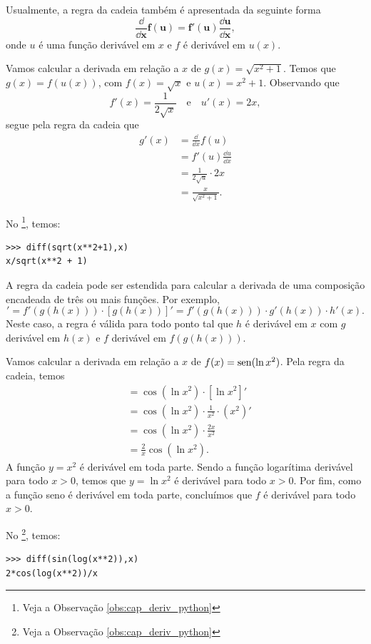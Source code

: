 Usualmente, a regra da cadeia também é apresentada da seguinte forma
\begin{equation}\label{eq:deriv_regra_da_cadeia}
  \pmb{\frac{\dd}{\dd x}f(u) = f'(u)\frac{\dd u}{\dd x}},
\end{equation}
onde $u$ é uma função derivável em $x$ e $f$ é derivável em $u(x)$.

\begin{ex}
  Vamos calcular a derivada em relação a $x$ de $g(x) = \sqrt{x^2+1}$. Temos que $g(x) = f(u(x))$, com $f(x) = \sqrt{x}$ e $u(x) = x^2+1$. Observando que
  \begin{equation}
    f'(x) = \frac{1}{2\sqrt{x}}\quad\text{e}\quad u'(x)=2x,
  \end{equation}
  segue pela regra da cadeia que
  \begin{align}
    g'(x) &= \frac{\dd}{\dd x}f(u) \\
          &= f'(u)\frac{\dd u}{\dd x} \\
          &= \frac{1}{2\sqrt{u}}\cdot 2x \\
          &= \frac{x}{\sqrt{x^2+1}}.
  \end{align}

  \ifispython
  No \sympy\footnote{Veja a Observação \ref{obs:cap_deriv_python}}, temos:
\begin{verbatim}
>>> diff(sqrt(x**2+1),x)
x/sqrt(x**2 + 1)
\end{verbatim}
  \fi  
\end{ex}

A regra da cadeia pode ser estendida para calcular a derivada de uma composição encadeada de três ou mais funções. Por exemplo,
\begin{equation}
  [f(g(h(x)))]' = f'(g(h(x)))\cdot[g(h(x))]' = f'(g(h(x)))\cdot g'(h(x))\cdot h'(x).
\end{equation}
Neste caso, a regra é válida para todo ponto tal que $h$ é derivável em $x$ com $g$ derivável em $h(x)$ e $f$ derivável em $f(g(h(x)))$.

\begin{ex}
  Vamos calcular a derivada em relação a $x$ de $f(x) = \operatorname{sen}(\ln x^2)$. Pela regra da cadeia, temos
  \begin{align}
    [\sen(\ln x^2)] &= \cos(\ln x^2)\cdot[\ln x^2]' \\
                    &= \cos(\ln x^2)\cdot \frac{1}{x^2}\cdot (x^2)' \\
                    &= \cos(\ln x^2)\cdot\frac{2x}{x^2} \\
                    &= \frac{2}{x}\cos(\ln x^2).
  \end{align}
  A função $y = x^2$ é derivável em toda parte. Sendo a função logarítima derivável para todo $x>0$, temos que $y = \ln x^2$ é derivável para todo $x>0$. Por fim, como a função seno é derivável em toda parte, concluímos que $f$ é derivável para todo $x>0$.

  \ifispython
  No \sympy\footnote{Veja a Observação \ref{obs:cap_deriv_python}}, temos:
\begin{verbatim}
>>> diff(sin(log(x**2)),x)
2*cos(log(x**2))/x
\end{verbatim}
  \fi  
\end{ex}

